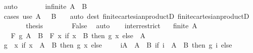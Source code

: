 \begin{isabellebody}
\ auto\isanewline
\ \ \ \ \isamarkupfalse%
\ \isamarkupfalse%
\ {\isachardoublequoteopen}infinite\ {\isacharparenleft}{\kern0pt}A\ {\isasymtimes}\ B{\isacharparenright}{\kern0pt}{\isachardoublequoteclose}\isanewline
\ \ \ \ \ \ \isamarkupfalse%
\ cases\ {\isacharparenleft}{\kern0pt}use\ {\isacartoucheopen}A\ {\isasymnoteq}\ {\isacharbraceleft}{\kern0pt}{\isacharbraceright}{\kern0pt}{\isacartoucheclose}\ {\isacartoucheopen}B\ {\isasymnoteq}\ {\isacharbraceleft}{\kern0pt}{\isacharbraceright}{\kern0pt}{\isacartoucheclose}\ \ {\isacartoucheopen}auto\ dest{\isacharcolon}{\kern0pt}\ finite{\isacharunderscore}{\kern0pt}cartesian{\isacharunderscore}{\kern0pt}productD{}\ finite{\isacharunderscore}{\kern0pt}cartesian{\isacharunderscore}{\kern0pt}productD{}{\isacartoucheclose}{\isacharparenright}{\kern0pt}\isanewline
\ \ \ \ \isamarkupfalse%
\ \isamarkupfalse%
\ {\isacharquery}{\kern0pt}thesis\isanewline
\ \ \ \ \ \ \isamarkupfalse%
\ False\ \isamarkupfalse%
\ auto\isanewline
\ \ \isamarkupfalse%
\isanewline
{}\isamarkupfalse%
%
\endisatagproof
{\isafoldproof}%
%
\isadelimproof
\isanewline
%
\endisadelimproof
\isanewline
{}\isamarkupfalse%
\ inter{\isacharunderscore}{\kern0pt}restrict{\isacharcolon}{\kern0pt}\isanewline
\ \ \ {\isachardoublequoteopen}finite\ A{\isachardoublequoteclose}\isanewline
\ \ \ {\isachardoublequoteopen}F\ g\ {\isacharparenleft}{\kern0pt}A\ {\isasyminter}\ B{\isacharparenright}{\kern0pt}\ {\isacharequal}{\kern0pt}\ F\ {\isacharparenleft}{\kern0pt}{\isasymlambda}x{\isachardot}{\kern0pt}\ if\ x\ {\isasymin}\ B\ then\ g\ x\ else\ \ A{\isachardoublequoteclose}\isanewline
%
\isadelimproof
%
\endisadelimproof
%
\isatagproof
{}\isamarkupfalse%
\ {\isacharminus}{\kern0pt}\isanewline
\ \ \isamarkupfalse%
\ {\isacharquery}{\kern0pt}g\ {\isacharequal}{\kern0pt}\ {\isachardoublequoteopen}{\isasymlambda}x{\isachardot}{\kern0pt}\ if\ x\ {\isasymin}\ A\ {\isasyminter}\ B\ then\ g\ x\ else\ \isanewline
\ \ \isamarkupfalse%
\ {\isachardoublequoteopen}{\isasymforall}i{\isasymin}A\ {\isacharminus}{\kern0pt}\ A\ {\isasyminter}\ B{\isachardot}{\kern0pt}\ {\isacharparenleft}{\kern0pt}if\ i\ {\isasymin}\ A\ {\isasyminter}\ B\ then\ g\ i\ else\ \ {\isacharequal}{\kern0pt}\ \ \isamarkupfalse%

\end{isabellebody}
